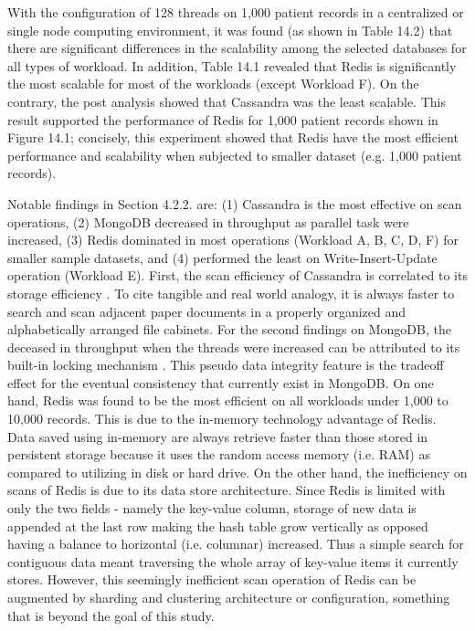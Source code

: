 \documentclass[5p]{elsarticle}
\begin{document}
With the configuration of 128 threads on 1,000 patient records in a centralized or single node computing environment, 
it was found (as shown in Table 14.2) that there are significant differences in the scalability among the selected databases for all types of workload.
In addition, Table 14.1 revealed that Redis is significantly the most scalable for most of the workloads (except Workload F). 
On the contrary, the post analysis showed that Cassandra was the least scalable. 
This result supported the performance of Redis for 1,000 patient records shown in Figure 14.1; 
concisely, this experiment showed that Redis have the most efficient performance and scalability when subjected to smaller dataset (e.g. 1,000 patient records). 

													
Notable findings in Section 4.2.2. are: (1) Cassandra is the most effective on scan operations, (2) MongoDB decreased in throughput as parallel task were increased, (3) Redis dominated in most operations (Workload A, B, C, D, F) for smaller sample datasets, and (4) performed the least on Write-Insert-Update operation (Workload E). 
First, the scan efficiency of Cassandra is correlated to its storage efficiency \cite{E.Chan2016}. To cite tangible and real world analogy, it is always faster to search and scan adjacent paper documents in a properly organized and alphabetically arranged file cabinets. For the second findings on MongoDB, the deceased in throughput when the threads were increased can be attributed to its built-in locking mechanism \cite{A.Kabakus2017520}. 
This pseudo data integrity feature is the tradeoff effect for the eventual consistency that currently exist in MongoDB. 
On one hand, Redis was found to be the most efficient on all workloads under 1,000 to 10,000 records. This is due to the in-memory technology advantage of Redis. Data saved using in-memory are always retrieve faster than those stored in persistent storage because it uses the random access memory (i.e. RAM) as compared to utilizing in disk or hard drive. On the other hand, the inefficiency on scans of Redis is due to its data store architecture. Since Redis is limited with only the two fields - namely the key-value column, storage of new data is appended at the last row making the hash table grow vertically as opposed having a balance to horizontal (i.e. columnar) increased. Thus a simple search for contiguous data meant traversing the whole array of key-value items it currently stores. However, this seemingly inefficient scan operation of Redis can be augmented by sharding and clustering architecture or configuration, something that is beyond the goal of this study.
\end{document}
